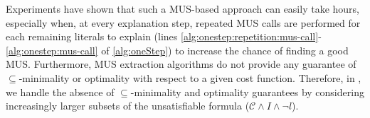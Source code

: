 \documentclass[a4paper,UKenglish,cleveref, autoref, thm-restate, pdfa]{lipics-v2021}
\newcommand\m[1]{\mathcal{#1}}
\renewcommand\comment[1]{}
\newcommand{\tias}[1]{{\comment{\color{blue}Tias:#1}}}
\newcommand{\emilio}[1]{{\comment{\color{red}Emilio: #1}}}
\newcommand{\bart}[1]{{\comment{\color{OliveGreen}Bart: #1}}}
\newcommand{\removed}[1]{\sout{#1}}
\newcommand\Iend{\ensuremath{I_\mathit{end} }\xspace}
\newcommand\formulac{\ensuremath{\m{C} }\xspace}
\newcommand\formularunning{\ensuremath{T_{rex} }\xspace}
\newcommand\mm[1]{\ensuremath{#1}\xspace}
\newcommand\negset[1]{\mm{\overline{#1}}}
\begin{document}
	
	Experiments have shown that such a MUS-based approach can easily take hours, especially when, at every explanation step, repeated MUS calls are performed for each remaining literals to explain (lines \ref{alg:onestep:repetition:mus-call}-\ref{alg:onestep:mus-call} of \cref{alg:oneStep}) to increase the chance of finding a good MUS. 
	Furthermore, MUS extraction algorithms do not provide any guarantee of $\subseteq$-minimality or optimality with respect to a given cost function. Therefore, in \cite{bogaerts2020framework}, we handle the absence of $\subseteq$-minimality and optimality guarantees by considering increasingly larger subsets of the unsatisfiable formula ($\formulac \land I \land \neg l$).
	
\end{document}

